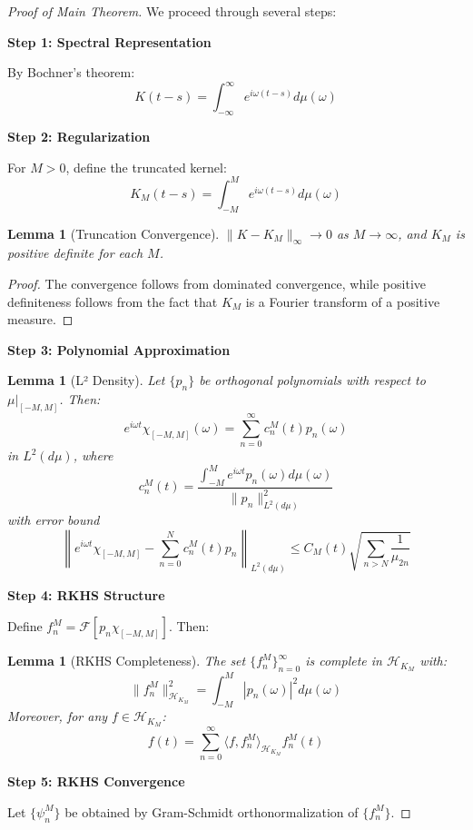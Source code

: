 \documentclass{article}
\newtheorem{lemma}[theorem]{Lemma}
\begin{document}
\begin{proof}[Proof of Main Theorem]
We proceed through several steps:

\textbf{Step 1: Spectral Representation}

By Bochner's theorem:
\[ K(t-s) = \int_{-\infty}^{\infty} e^{i\omega(t-s)} d\mu(\omega) \]

\textbf{Step 2: Regularization}

For $M > 0$, define the truncated kernel:
\[ K_M(t-s) = \int_{-M}^M e^{i\omega(t-s)} d\mu(\omega) \]

\begin{lemma}[Truncation Convergence]
$\|K - K_M\|_{\infty} \to 0$ as $M \to \infty$, and $K_M$ is positive definite for each $M$.
\end{lemma}

\begin{proof}
The convergence follows from dominated convergence, while positive definiteness follows from the fact that $K_M$ is a Fourier transform of a positive measure.
\end{proof}

\textbf{Step 3: Polynomial Approximation}

\begin{lemma}[L² Density]
Let $\{p_n\}$ be orthogonal polynomials with respect to $\mu|_{[-M,M]}$. Then:
\[ e^{i\omega t} \chi_{[-M,M]}(\omega) = \sum_{n=0}^{\infty} c_n^M(t)p_n(\omega) \]
in $L^2(d\mu)$, where
\[ c_n^M(t) = \frac{\int_{-M}^M e^{i\omega t}p_n(\omega)d\mu(\omega)}{\|p_n\|^2_{L^2(d\mu)}} \]
with error bound
\[ \left\|e^{i\omega t}\chi_{[-M,M]} - \sum_{n=0}^N c_n^M(t)p_n\right\|_{L^2(d\mu)} \leq C_M(t)\sqrt{\sum_{n>N} \frac{1}{\mu_{2n}}} \]
\end{lemma}

\textbf{Step 4: RKHS Structure}

Define $f_n^M = \mathcal{F}[p_n \chi_{[-M,M]}]$. Then:

\begin{lemma}[RKHS Completeness]
The set $\{f_n^M\}_{n=0}^{\infty}$ is complete in $\mathcal{H}_{K_M}$ with:
\[ \|f_n^M\|^2_{\mathcal{H}_{K_M}} = \int_{-M}^M |p_n(\omega)|^2d\mu(\omega) \]
Moreover, for any $f \in \mathcal{H}_{K_M}$:
\[ f(t) = \sum_{n=0}^{\infty} \langle f, f_n^M \rangle_{\mathcal{H}_{K_M}} f_n^M(t) \]
\end{lemma}

\textbf{Step 5: RKHS Convergence}

Let $\{\psi_n^M\}$ be obtained by Gram-Schmidt orthonormalization of $\{f_n^M\}$.


\end{proof}
\end{document}
